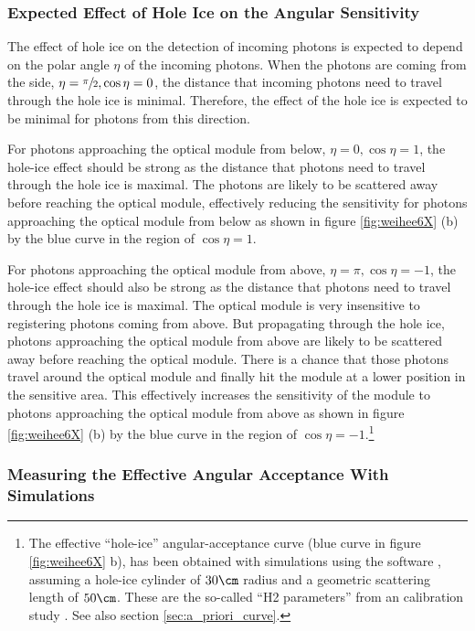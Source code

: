 \subsubsection{Expected Effect of Hole Ice on the Angular Sensitivity}
\label{sec:hole_ice_effects}

The effect of hole ice on the detection of incoming photons is expected to depend on the polar angle $\eta$ of the incoming photons. \cite{icepaper} When the photons are coming from the side, $\eta = \sfrac{\pi}{2}, \cos \eta = 0$, the distance that incoming photons need to travel through the hole ice is minimal. Therefore, the effect of the hole ice is expected to be minimal for photons from this direction.

For photons approaching the optical module from below, $\eta = 0, \cos \eta = 1$, the hole-ice effect should be strong as the distance that photons need to travel through the hole ice is maximal. The photons are likely to be scattered away before reaching the optical module, effectively reducing the sensitivity for photons approaching the optical module from below as shown in figure \ref{fig:weihee6X} (b) by the blue curve in the region of $\cos \eta = 1$.

For photons approaching the optical module from above, $\eta = \pi, \cos \eta = -1$, the hole-ice effect should also be strong as the distance that photons need to travel through the hole ice is maximal. The optical module is very insensitive to registering photons coming from above. But propagating through the hole ice, photons approaching the optical module from above are likely to be scattered away before reaching the optical module. There is a chance that those photons travel around the optical module and finally hit the module at a lower position in the sensitive area. This effectively increases the sensitivity of the module to photons approaching the optical module from above as shown in figure \ref{fig:weihee6X} (b) by the blue curve in the region of $\cos \eta = -1$.\footnote{The effective ``hole-ice'' angular-acceptance curve (blue curve in figure \ref{fig:weihee6X} b), has been obtained with simulations using the  software \cite{lundberg}, assuming a hole-ice cylinder of $30\cm$ radius and a geometric scattering length of $50\cm$. These are the so-called ``H2 parameters'' from an  calibration study \cite{holeicestudieswithyag,icemodelsdata}. See also section \ref{sec:a_priori_curve}.}


\subsubsection{Measuring the Effective Angular Acceptance With Simulations}
\label{sec:measuring_angular_acceptance_with_simulations}\label{sec:gauging}

